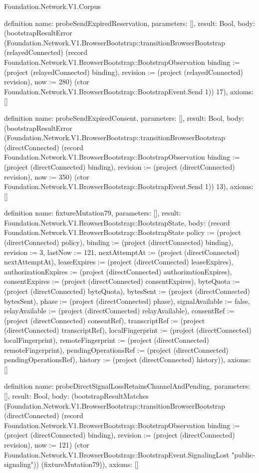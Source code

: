 \begin{lexlean}{Foundation.Network.V1.Corpus}
\begin{semanticmodule}
definition{
  name: probeSendExpiredReservation,
  parameters: [],
  result: Bool,
  body: (bootstrapResultError (Foundation.Network.V1.BrowserBootstrap::transitionBrowserBootstrap (relayedConnected) (record Foundation.Network.V1.BrowserBootstrap::BootstrapObservation {binding := (project (relayedConnected) binding), revision := (project (relayedConnected) revision), now := 280}) (ctor Foundation.Network.V1.BrowserBootstrap::BootstrapEvent.Send 1)) 17),
  axioms: []
}

definition{
  name: probeSendExpiredConsent,
  parameters: [],
  result: Bool,
  body: (bootstrapResultError (Foundation.Network.V1.BrowserBootstrap::transitionBrowserBootstrap (directConnected) (record Foundation.Network.V1.BrowserBootstrap::BootstrapObservation {binding := (project (directConnected) binding), revision := (project (directConnected) revision), now := 350}) (ctor Foundation.Network.V1.BrowserBootstrap::BootstrapEvent.Send 1)) 13),
  axioms: []
}

definition{
  name: fixtureMutation79,
  parameters: [],
  result: Foundation.Network.V1.BrowserBootstrap::BootstrapState,
  body: (record Foundation.Network.V1.BrowserBootstrap::BootstrapState {policy := (project (directConnected) policy), binding := (project (directConnected) binding), revision := 3, lastNow := 121, nextAttemptAt := (project (directConnected) nextAttemptAt), leaseExpires := (project (directConnected) leaseExpires), authorizationExpires := (project (directConnected) authorizationExpires), consentExpires := (project (directConnected) consentExpires), byteQuota := (project (directConnected) byteQuota), bytesSent := (project (directConnected) bytesSent), phase := (project (directConnected) phase), signalAvailable := false, relayAvailable := (project (directConnected) relayAvailable), consentRef := (project (directConnected) consentRef), transcriptRef := (project (directConnected) transcriptRef), localFingerprint := (project (directConnected) localFingerprint), remoteFingerprint := (project (directConnected) remoteFingerprint), pendingOperationsRef := (project (directConnected) pendingOperationsRef), history := (project (directConnected) history)}),
  axioms: []
}

definition{
  name: probeDirectSignalLossRetainsChannelAndPending,
  parameters: [],
  result: Bool,
  body: (bootstrapResultMatches (Foundation.Network.V1.BrowserBootstrap::transitionBrowserBootstrap (directConnected) (record Foundation.Network.V1.BrowserBootstrap::BootstrapObservation {binding := (project (directConnected) binding), revision := (project (directConnected) revision), now := 121}) (ctor Foundation.Network.V1.BrowserBootstrap::BootstrapEvent.SignalingLost "public-signaling")) (fixtureMutation79)),
  axioms: []
}


\end{semanticmodule}
\end{lexlean}
